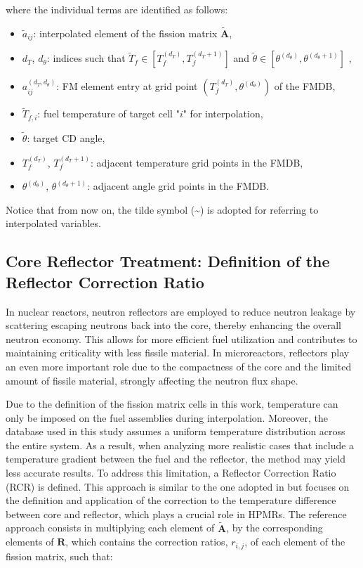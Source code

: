 \documentclass[preprint,review,12pt]{elsarticle}
\begin{document}
where the individual terms are identified as follows:
\begin{itemize}
  \item $\tilde{a}_{ij}$: interpolated element of the fission matrix $\tilde{\mathbf{A}}$,
  \item $d_T$, $d_{\theta}$: indices such that $\tilde{T}_f \in [T_f^{(d_T)}, T_f^{(d_T+1)}]$ and $\tilde{\theta} \in [\theta^{(d_{\theta})}, \theta^{(d_{\theta}+1)}]$  ,
  \item $a_{ij}^{(d_T, d_{\theta})}$: FM element entry at grid point $(T_f^{(d_T)}, \theta^{(d_{\theta})})$ of the FMDB,
  \item $\tilde{T}_{f,i}$: fuel temperature of target cell "$i$" for interpolation,
  \item $\tilde{\theta}$: target CD angle,
  \item $T_f^{(d_T)}$, $T_f^{(d_T+1)}$: adjacent temperature grid points in the FMDB,
  \item $\theta^{(d_{\theta})}$, $\theta^{(d_{\theta}+1)}$: adjacent angle grid points in the FMDB.
\end{itemize}

Notice that from now on, the tilde symbol (\textasciitilde) is adopted for referring to interpolated variables.   

\subsection{Core Reflector Treatment: Definition of the Reflector Correction Ratio} \label{subsection:Core reflector treatment}
In nuclear reactors, neutron reflectors are employed to reduce neutron leakage by scattering escaping neutrons back into the core, thereby enhancing the overall neutron economy. This allows for more efficient fuel utilization and contributes to maintaining criticality with less fissile material. In microreactors, reflectors play an even more important role due to the compactness of the core and the limited amount of fissile material, strongly affecting the neutron flux shape.

Due to the definition of the fission matrix cells in this work, temperature can only be imposed on the fuel assemblies during interpolation. Moreover, the database used in this study assumes a uniform temperature distribution across the entire system. As a result, when analyzing more realistic cases that include a temperature gradient between the fuel and the reflector, the method may yield less accurate results. To address this limitation, a Reflector Correction Ratio (RCR) is defined. This approach is similar to the one adopted in \cite{Rau2020} but focuses on the definition and application of the correction to the temperature difference between core and reflector, which plays a crucial role in HPMRs. The reference approach consists in multiplying each element of $\tilde{\textbf{A}}$, by the corresponding elements of $\textbf{R}$, which contains the correction ratios,  $r_{i,j}$,  of each element of the fission matrix, such that: 
\end{document}
